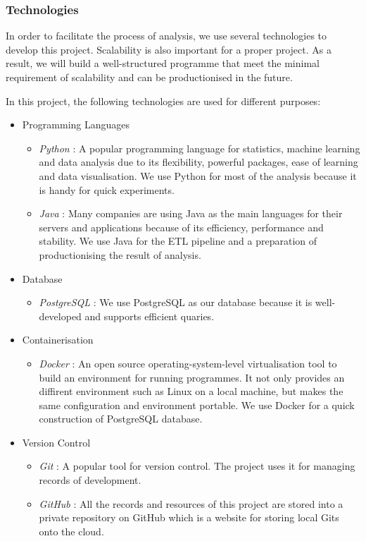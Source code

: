 \documentclass[11pt]{article} %
\theoremstyle{plain}
\theoremstyle{definition}
\begin{document}
\subsubsection{Technologies}

In order to facilitate the process of analysis, we use several technologies to develop this project. Scalability is also important for a proper project. As a result, we will build a well-structured programme that meet the minimal requirement of scalability and can be productionised in the future.

In this project, the following technologies are used for different purposes:
\begin{itemize}
  \item Programming Languages
  \begin{itemize}
    \item \textsl{Python} : A popular programming language for statistics, machine learning and data analysis due to its flexibility, powerful packages, ease of learning and data visualisation. We use Python for most of the analysis because it is handy for quick experiments.
    \item \textsl{Java} : Many companies are using Java as the main languages for their servers and applications because of its efficiency, performance and stability. We use Java for the ETL pipeline and a preparation of productionising the result of analysis.
  \end{itemize}

  \item Database
  \begin{itemize}
    \item \textsl{PostgreSQL}\cite{postgresql} : We use PostgreSQL as our database because it is well-developed and supports efficient quaries.
  \end{itemize}

  \item Containerisation
  \begin{itemize}
    \item \textsl{Docker}\cite{docker} : An open source operating-system-level virtualisation tool to build an environment for running programmes. It not only provides an diffirent environment such as Linux on a local machine, but makes the same configuration and environment portable. We use Docker for a quick construction of PostgreSQL database.
  \end{itemize}

  \item Version Control
  \begin{itemize}
    \item \textsl{Git}\cite{git} : A popular tool for version control. The project uses it for managing records of development.
    \item \textsl{GitHub}\cite{github} : All the records and resources of this project are stored into a private repository on GitHub which is a website for storing local Gits onto the cloud.
  \end{itemize}


\end{itemize}
\end{document}
